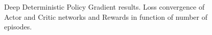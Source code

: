 \begin{figure}[H]
    \centering
    \qquad
    \qquad
    \qquad
    \caption{Deep Deterministic Policy Gradient results. Loss convergence of Actor and Critic networks and Rewards in function of number of episodes.}
    \label{fig:ddpgres}
\end{figure}

